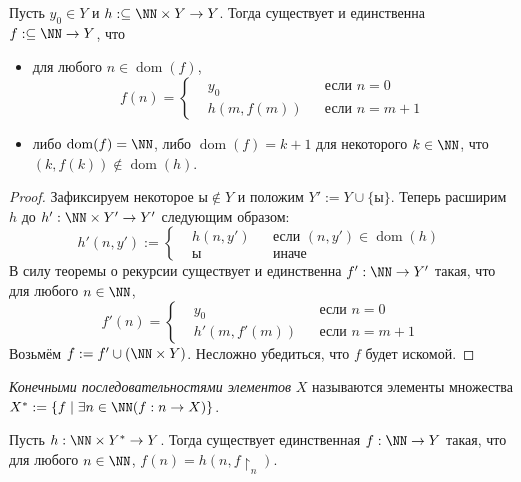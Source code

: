 \documentclass[12pt,a4paper]{article}
\DeclareMathOperator{\dom}{dom}
\begin{document}
    \begin{theorem}
        Пусть $y_0 \in Y$ и $h: \subseteq \NN \times Y \to Y$. Тогда существует и единственна $f: \subseteq \NN \to Y$, что
        \begin{itemize}
            \item для любого $n \in \dom(f)$,
                \[f(n) = \left\{\begin{aligned}
                    &y_0 && \text{если $n = 0$}\\
                    &h(m, f(m)) && \text{если $n = m + 1$}
                \end{aligned}\right.\]
            \item либо $\dom(f) = \NN$, либо $\dom(f) = k + 1$ для некоторого $k \in \NN$, что $(k, f(k)) \notin \dom(h)$.
        \end{itemize}
    \end{theorem}

    \begin{proof}
        Зафиксируем некоторое $\text{ы} \notin Y$ и положим $Y' := Y \cup \{\text{ы}\}$. Теперь расширим $h$ до $h': \NN \times Y' \to Y'$ следующим образом:
        \[h'(n, y') := \left\{\begin{aligned}
            &h(n, y') && \text{если $(n, y') \in \dom(h)$}\\
            &\text{ы} && \text{иначе}
        \end{aligned}\right.\]
        В силу теоремы о рекурсии существует и единственна $f': \NN \to Y'$ такая, что для любого $n \in \NN$,
        \[f'(n) = \left\{\begin{aligned}
            &y_0 && \text{если $n=0$}\\
            &h'(m, f'(m)) && \text{если $n=m+1$}
        \end{aligned}\right.\]
        Возьмём $f := f' \cup (\NN \times Y)$. Несложно убедиться, что $f$ будет искомой.
    \end{proof}

    \begin{definition}
        \emph{Конечными последовательностями элементов} $X$ называются элементы множества $X^* := \{f \mid \exists n \in \NN (f: n \to X)\}$.
    \end{definition}

    \begin{theorem}
        Пусть $h: \NN \times Y^* \to Y$. Тогда существует единственная $f: \NN \to Y$ такая, что для любого $n \in \NN$, $f(n) = h(n, f\upharpoonright_n)$.
    \end{theorem}
\end{document}
